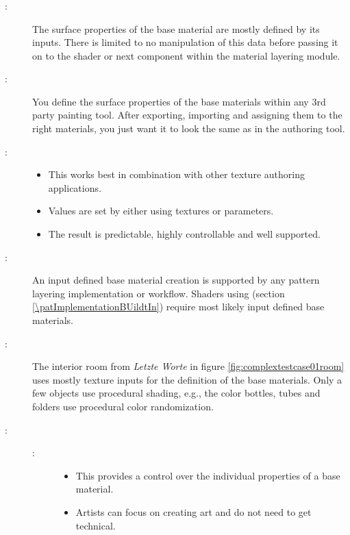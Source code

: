 \subsubsection{\patCreationInputDefined}\label{\patCreationInputDefined}
\begin{description}
	\item[\patIntent:]%
	The surface properties of the base material are mostly defined by its inputs. There is limited to no manipulation of this data before passing it on to the shader or next component within the material layering module. 
	\item[\patMotivation:]%
	You define the surface properties of the base materials within any 3rd party painting tool. After exporting, importing and assigning them to the right materials, you just want it to look the same as in the authoring tool.  
	\item[\patApplicability:]\hfill 
	\begin{itemize}\mynobreakpar
		\item This works best in combination with other texture authoring applications. 
		\item Values are set by either using textures or parameters.
		\item The result is predictable, highly controllable and well supported.  
	\end{itemize}
	\item[\patImplementation:]%
	An input defined base material creation is supported by any pattern layering implementation or workflow. Shaders using \emph{\patImplementationBUildtIn} (section \ref{\patImplementationBUildtIn}) require most likely input defined base materials. 
	\item[\patExamples:]%
	The interior room from \emph{Letzte Worte} in figure \ref{fig:complextestcase01room} uses mostly texture inputs for the definition of the base materials. Only a few objects use procedural shading, e.g., the color bottles, tubes and folders use procedural color randomization. 
	\item[\patConsequences:]\hfill
	\begin{description}
		\item[\visual:]\hfill
			\begin{itemize}\mynobreakpar
				\item This provides a control over the individual properties of a base material. 
				\item Artists can focus on creating art and do not need to get technical. 

\end{itemize}
\end{description}
\end{description}
